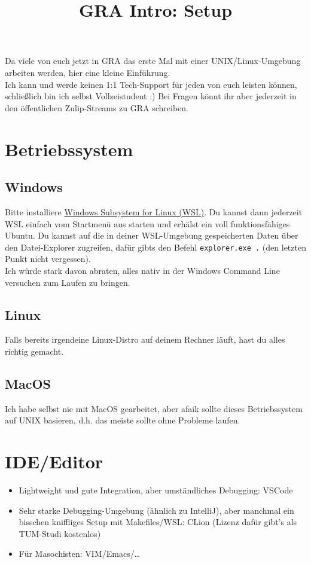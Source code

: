 \documentclass{article}
\title{\vspace{-4cm}GRA Intro: Setup}
\date{}
\author{}
\begin{document}
\maketitle
\vspace{-1.5cm}

Da viele von euch jetzt in GRA das erste Mal mit
einer UNIX/Linux-Umgebung arbeiten werden, hier eine kleine Einführung.\\ Ich kann und werde keinen 1:1 Tech-Support für jeden von euch leisten
können, schließlich bin ich selbst Vollzeistudent :) Bei Fragen könnt ihr aber jederzeit in den öffentlichen Zulip-Streams zu
GRA schreiben.

\section{Betriebssystem}
\subsection{Windows}
Bitte installiere \href{https://learn.microsoft.com/de-de/windows/wsl/install}{Windows Subsystem for Linux (WSL)}.
Du kannst dann jederzeit WSL einfach vom Startmenü aus starten und erhälst ein voll funktionsfähiges Ubuntu.
Du kannst auf die in deiner WSL-Umgebung gespeicherten Daten über den Datei-Explorer zugreifen, dafür gibts den Befehl
\verb|explorer.exe .| (den letzten Punkt nicht vergessen).\\
Ich würde stark davon abraten, alles nativ in der Windows Command Line versuchen zum Laufen zu bringen.
\subsection{Linux}
Falls bereits irgendeine Linux-Distro auf deinem Rechner läuft, hast du alles
richtig gemacht.
\subsection{MacOS}
Ich habe selbst nie mit MacOS gearbeitet, aber afaik sollte dieses Betriebssystem
auf UNIX basieren, d.h. das meiste sollte ohne Probleme laufen.
\section{IDE/Editor}
\begin{itemize}
	\item Lightweight und gute Integration, aber umständliches Debugging: VSCode
	\item Sehr starke Debugging-Umgebung (ähnlich zu IntelliJ), aber manchmal ein bisschen kniffliges Setup mit Makefiles/WSL: CLion (Lizenz dafür gibt's als TUM-Studi kostenlos)
	\item Für Masochisten: VIM/Emacs/\ldots
\end{itemize}
\end{document}
